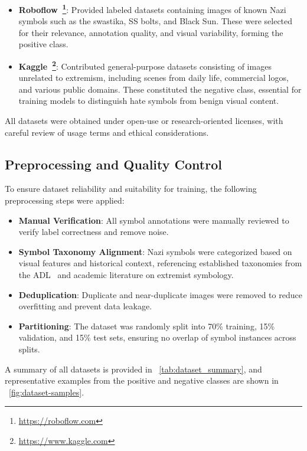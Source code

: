 \begin{itemize}
  \item \textbf{Roboflow~\footnote{\url{https://roboflow.com}}}: Provided labeled datasets containing images of
  known Nazi symbols such as the swastika, \ac{SS} bolts, and Black Sun. These were selected for their relevance,
  annotation quality, and visual variability, forming the positive class.

  \item \textbf{Kaggle~\footnote{\url{https://www.kaggle.com}}}: Contributed general-purpose datasets consisting of
  images unrelated to extremism, including scenes from daily life, commercial logos, and various public domains.
  These constituted the negative class, essential for training models to distinguish hate symbols from benign
  visual content.
\end{itemize}

All datasets were obtained under open-use or research-oriented licenses, with careful review of usage terms and
ethical considerations.

\subsection{Preprocessing and Quality Control}

To ensure dataset reliability and suitability for training, the following preprocessing steps were applied:

\begin{itemize}
  \item \textbf{Manual Verification}: All symbol annotations were manually reviewed to verify label correctness and
  remove noise.
  \item \textbf{Symbol Taxonomy Alignment}: Nazi symbols were categorized based on visual features and historical
  context, referencing established taxonomies from the \ac{ADL}~\parencite{ADL1913} and academic literature on
  extremist symbology.
  \item \textbf{Deduplication}: Duplicate and near-duplicate images were removed to reduce overfitting and prevent
  data leakage.
  \item \textbf{Partitioning}: The dataset was randomly split into 70\% training, 15\% validation, and 15\% test
  sets, ensuring no overlap of symbol instances across splits.
\end{itemize}

A summary of all datasets is provided in ~\autoref{tab:dataset_summary}, and representative examples from the
positive and negative classes are shown in ~\autoref{fig:dataset-samples}.

